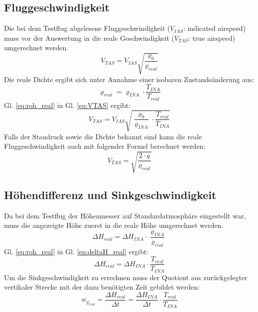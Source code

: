 \subsection{Fluggeschwindigkeit}
Die bei dem Testflug abgelesene Fluggeschwindigkeit ($V_{IAS}$: indicated airspeed) muss vor der Auswertung in die reale Geschwindigkeit ($V_{TAS}$: true airspeed) umgerechnet werden.
\begin{equation} \label{eq:VTAS}
V_{TAS}=V_{IAS} \sqrt{\frac{\varrho_0}{\varrho_{real}}}
\end{equation} 
Die reale Dichte ergibt sich unter Annahme einer isobaren Zustandsänderung aus:
\begin{equation} \label{eq:roh_real}
\varrho_{real} = \varrho_{INA}  \cdot  \frac{T_{INA}}{T_{real}}
\end{equation}
Gl. \ref{eq:roh_real} in Gl. \ref{eq:VTAS} ergibt:
\begin{equation}
V_{TAS}=V_{IAS} \sqrt{\frac{\varrho_0}{\varrho_{INA}} \cdot \frac{T_{real}}{T_{INA}}}
\end{equation}
Falls der Staudruck sowie die Dichte bekannt sind kann die reale Fluggeschwindigkeit auch mit folgender Formel berechnet werden:
\begin{equation} \label{eq:vüberq}
V_{TAS} = \sqrt{\frac{2 \cdot q}{\varrho_{real}}}
\end{equation}
%
\vspace{10mm}
\subsection{Höhendifferenz und Sinkgeschwindigkeit}
Da bei dem Testflug der Höhenmesser auf Standardatmosphäre eingestellt war, muss die angezeigte Höhe zuerst in die reale Höhe umgerechnet werden.
\begin{equation} \label{eq:deltaH_real}
\Delta H_{real} = \Delta H_{INA}  \cdot  \frac{\varrho_{INA}}{\varrho_{real}}
\end{equation}
Gl. \ref{eq:roh_real} in Gl. \ref{eq:deltaH_real} ergibt:
\begin{equation}
\Delta H_{real} = \Delta H_{INA}  \cdot  \frac{T_{real}}{T_{INA}}
\end{equation}
Um die Sinkgeschwindigkeit zu errechnen muss der Quotient aus zurückgelegter vertikaler Strecke mit der dazu benötigten Zeit gebildet werden:
\begin{equation}\label{eq:wg_real}
w_{g_{real}}=\frac{\Delta H_{real}}{\Delta t} = \frac{\Delta H_{INA}}{\Delta t}  \cdot  \frac{T_{real}}{T_{INA}}
\end{equation}


\newpage